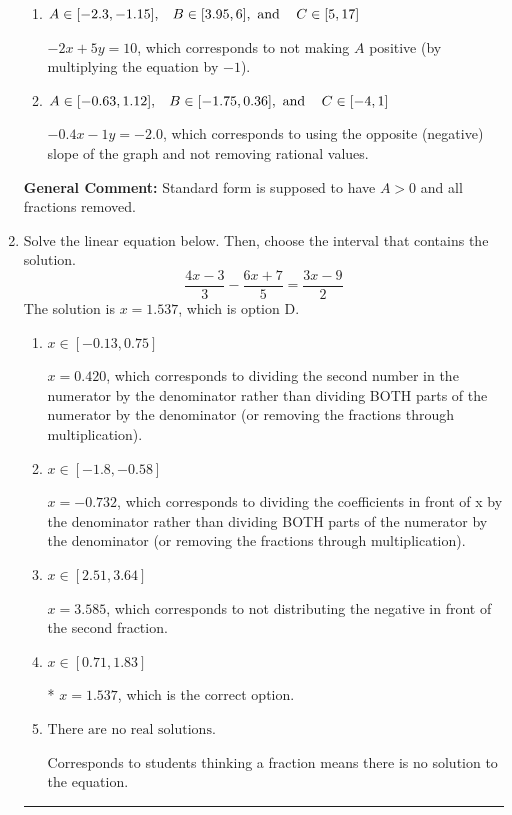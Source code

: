 \documentclass{extbook}[14pt]
\newcommand{\litem}[1]{\item #1

\rule{\textwidth}{0.4pt}}
\begin{document}
\begin{enumerate}
{\begin{enumerate}[label=\Alph*.]
 $2x + 5y = 10$, which corresponds to using the opposite (negative) slope of the graph, but did everything else correctly.
\item \( A \in [-2.3, -1.15], \hspace{3mm} B \in [3.95, 6], \text{ and } \hspace{3mm} C \in [5, 17] \)

 $-2x + 5y = 10$, which corresponds to not making $A$ positive (by multiplying the equation by $-1$).
\item \( A \in [-0.63, 1.12], \hspace{3mm} B \in [-1.75, 0.36], \text{ and } \hspace{3mm} C \in [-4, 1] \)

 $-0.4x - 1y = -2.0$, which corresponds to using the opposite (negative) slope of the graph and not removing rational values.
\end{enumerate}

\textbf{General Comment:} Standard form is supposed to have $A > 0$ and all fractions removed.
}
\litem{
Solve the linear equation below. Then, choose the interval that contains the solution.
\[ \frac{4x -3}{3} - \frac{6x + 7}{5} = \frac{3x -9}{2} \]The solution is \( x = 1.537 \), which is option D.\begin{enumerate}[label=\Alph*.]
\item \( x \in [-0.13, 0.75] \)

 $x = 0.420$, which corresponds to dividing the second number in the numerator by the denominator rather than dividing BOTH parts of the numerator by the denominator (or removing the fractions through multiplication).
\item \( x \in [-1.8, -0.58] \)

 $x = -0.732$, which corresponds to dividing the coefficients in front of x by the denominator rather than dividing BOTH parts of the numerator by the denominator (or removing the fractions through multiplication).
\item \( x \in [2.51, 3.64] \)

 $x = 3.585$, which corresponds to not distributing the negative in front of the second fraction.
\item \( x \in [0.71, 1.83] \)

* $x = 1.537$, which is the correct option.
\item \( \text{There are no real solutions.} \)

Corresponds to students thinking a fraction means there is no solution to the equation.
\end{enumerate}

}
\end{enumerate}
\end{document}
